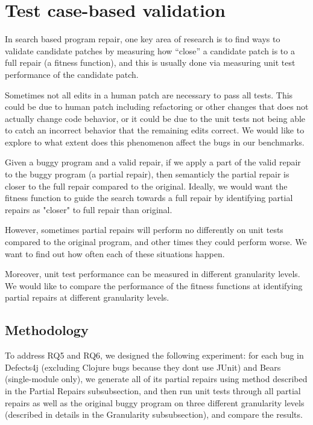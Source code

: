 \documentclass[sigconf, timestamp-false, anonymous=true]{acmart}
\begin{document}
\section{Test case-based validation}

In search based program repair, one key area of research is to find ways to validate
candidate patches by
measuring how ``close'' a candidate patch is to a full repair (a fitness function),
and this is usually done via measuring unit test performance of the candidate patch. 


Sometimes not all edits in a human patch are necessary to pass all tests. This could be
due to human patch including refactoring or other changes that does not actually
change code behavior, or it could be due to the unit tests not being able to catch
an incorrect behavior that the remaining edits correct. We would like to explore
to what extent does this phenomenon affect the bugs in our benchmarks.


Given a buggy program and a valid repair, if we apply a part of the valid repair to 
the buggy program (a partial repair), then semanticly the partial repair is closer
 to the full repair compared to the original. 
Ideally, we would want the fitness function to guide the search towards a full 
repair by identifying partial repairs as "closer" to full repair than original.

However, sometimes partial repairs will perform no differently on unit tests compared 
to the original program, and other times they could perform worse. We want to find 
out how often each of these situations happen.

Moreover, unit test performance can be measured in different granularity levels. 
We would like to compare the performance of the fitness functions at identifying 
partial repairs at different granularity levels.


\subsection{Methodology}
\label{sec:partial-repair-methodology}

To address RQ5 and RQ6, we designed the following experiment: for each bug in 
Defects4j 
(excluding Clojure bugs because they dont use JUnit) 
and Bears (single-module only), we generate all of its partial repairs using method described in 
the Partial Repairs subsubsection, and then run unit tests through all partial repairs
as well as the original buggy program on three different granularity levels (described
in details in the Granularity subsubsection), and compare the results.
\end{document}
